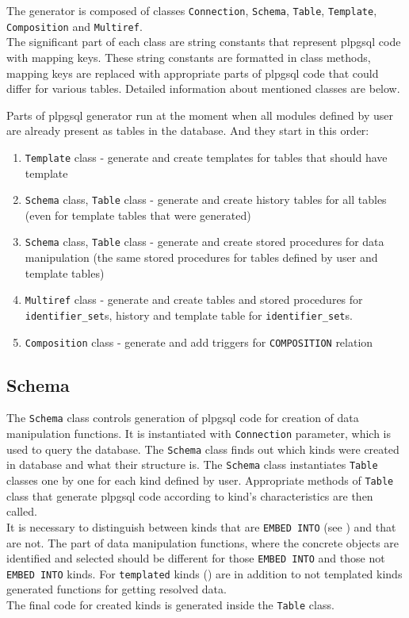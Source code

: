 \documentclass[deska]{subfiles}
\begin{document}
The generator is composed of classes {\tt Connection}, {\tt Schema}, {\tt Table}, {\tt Template}, {\tt Composition} and {\tt Multiref}.\\
The significant part of each class are string constants that represent plpgsql code with mapping keys. These string constants are formatted in class methods, mapping keys are replaced with appropriate parts of plpgsql code that could differ for various tables.
Detailed information about mentioned classes are below.

Parts of plpgsql generator run at the moment when all modules defined by user are already present as tables in the database. And they start in this order:

\begin{enumerate}
    \item {\tt Template} class - generate and create templates for tables that should have template
    \item {\tt Schema} class, {\tt Table} class - generate and create history tables for all tables (even for template tables that were generated)
    \item {\tt Schema} class, {\tt Table} class - generate and create stored procedures for data manipulation (the same stored procedures for tables defined by user and template tables)
    \item {\tt Multiref} class - generate and create tables and stored procedures for {\tt identifier\_set}s, history and template table for {\tt identifier\_set}s.
    \item {\tt Composition} class - generate and add triggers for {\tt COMPOSITION} relation
\end{enumerate}

\subsection{Schema}
The {\tt Schema} class controls generation of plpgsql code for creation of data manipulation functions. It is instantiated with {\tt Connection} parameter, which is used to query the database. 
The {\tt Schema} class finds out which kinds were created in database and what their structure is. The {\tt Schema} class instantiates {\tt Table} classes one by one for each kind defined by user. Appropriate methods of {\tt Table} class that generate plpgsql code according to kind's characteristics are then called.\\ It is necessary to distinguish between kinds that are {\tt EMBED INTO} (see ) and that are not. The part of data manipulation functions, where the concrete objects are identified and selected should be different for those {\tt EMBED INTO} and those not {\tt EMBED INTO} kinds.
For {\tt templated} kinds () are in addition to not templated kinds generated functions for getting resolved data.\\
The final code for created kinds is generated inside the {\tt Table} class.
\end{document}
